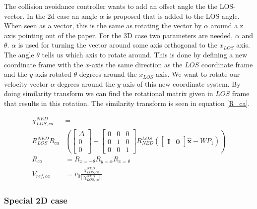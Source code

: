 The collision avoidance controller wants to add an offset angle the the LOS-vector. In the 2d case an angle $\alpha$ is proposed that is added to the LOS angle. When seen as a vector, this is the same as rotating the vector by $\alpha$ around a z axis pointing out of the paper. For the 3D case two parameters are needed, $\alpha$ and $\theta$. $\alpha$ is used for turning the vector around some axis orthogonal to the $x_{LOS}$ axis. The angle $\theta$ tells us which axis to rotate around. This is done by defining a new coordinate frame with the $x$-axis the same direction as the $LOS$ coordinate frame and the $y$-axis rotated $\theta$ degrees around the $x_{LOS}$-axis. We want to rotate our velocity vector $\alpha$ degrees around the $y$-axis of this new coordinate system. By doing similarity transform we can find the rotational matrix given in $LOS$ frame that results in this rotation. The similarity transform is seen in equation \eqref{R_ca}.



\begin{align}
    \chi^{NED}_{LOS,ca} & =  \label{chi^los_los,ca}\\R^{NED}_{LOS}  R_{ca} &\left(  \begin{bmatrix}\Delta \\ 0 \\ 0\end{bmatrix} - \begin{bmatrix} 0 & 0 & 0 \\ 0 & 1 & 0 \\ 0 & 0 & 1 \end{bmatrix} R^{LOS}_{NED} (\begin{bmatrix} \mathbf{I} & \mathbf{0} \end{bmatrix} \hat{\textbf{x}} - WP_1) \right) \nonumber\\
    R_{ca} & = R_{x=-\theta} R_{y=\alpha} R_{x=\theta} \label{R_ca}\\
    V_{ref,ca} & = v_0 \frac{\chi^{NED}_{LOS,ca} }{|| \chi^{NED}_{LOS,ca} ||} \label{V_ref,ca}
\end{align}


\subsubsection*{Special 2D case}


